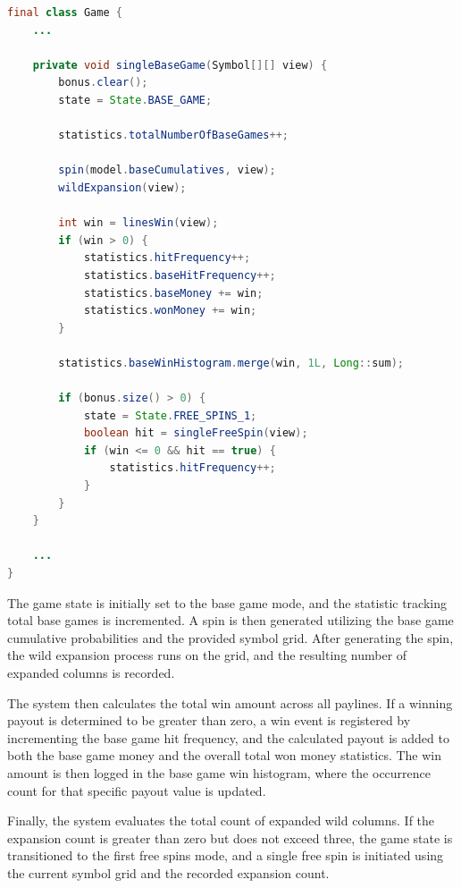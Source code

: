 \documentclass[12pt,twoside,openany]{book}
\begin{document}
\begin{lstlisting}[language=Java, caption={Single base game}, label=listing-016]
final class Game {
	...

	private void singleBaseGame(Symbol[][] view) {
		bonus.clear();
		state = State.BASE_GAME;

		statistics.totalNumberOfBaseGames++;

		spin(model.baseCumulatives, view);
		wildExpansion(view);

		int win = linesWin(view);
		if (win > 0) {
			statistics.hitFrequency++;
			statistics.baseHitFrequency++;
			statistics.baseMoney += win;
			statistics.wonMoney += win;
		}

		statistics.baseWinHistogram.merge(win, 1L, Long::sum);

		if (bonus.size() > 0) {
			state = State.FREE_SPINS_1;
			boolean hit = singleFreeSpin(view);
			if (win <= 0 && hit == true) {
				statistics.hitFrequency++;
			}
		}
	}

	...
}
\end{lstlisting}

The game state is initially set to the base game mode, and the statistic tracking total base games is incremented. A spin is then generated utilizing the base game cumulative probabilities and the provided symbol grid. After generating the spin, the wild expansion process runs on the grid, and the resulting number of expanded columns is recorded.

The system then calculates the total win amount across all paylines. If a winning payout is determined to be greater than zero, a win event is registered by incrementing the base game hit frequency, and the calculated payout is added to both the base game money and the overall total won money statistics. The win amount is then logged in the base game win histogram, where the occurrence count for that specific payout value is updated.

Finally, the system evaluates the total count of expanded wild columns. If the expansion count is greater than zero but does not exceed three, the game state is transitioned to the first free spins mode, and a single free spin is initiated using the current symbol grid and the recorded expansion count.
\end{document}
